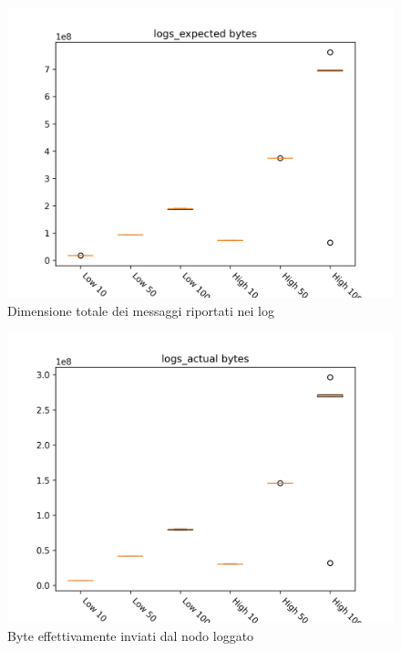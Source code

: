 \documentclass[target=bach]{thud}
\begin{document}
\begin{figure}[H]
    \includegraphics[width=\linewidth, height=0.4\textheight, keepaspectratio]{graphs/logs_expected bytes.png}
    \caption{Dimensione totale dei messaggi riportati nei log}
    \label{fig:leb}
\end{figure}

\begin{figure}[H]
    \includegraphics[width=\linewidth, height=0.4\textheight, keepaspectratio]{graphs/logs_actual bytes.png}
    \caption{Byte effettivamente inviati dal nodo loggato}
    \label{fig:lab}
\end{figure}
\end{document}
